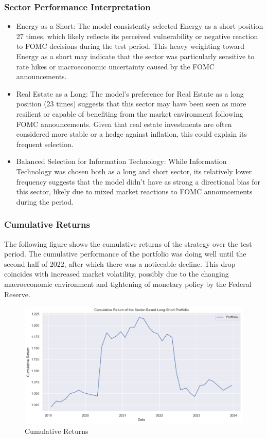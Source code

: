 \documentclass[11pt]{article}
\begin{document}
\subsubsection*{Sector Performance Interpretation}
\begin{itemize}
    \item Energy as a Short: The model consistently selected Energy as a short position 27 times, which likely reflects its perceived vulnerability or negative reaction to FOMC decisions during the test period. This heavy weighting toward Energy as a short may indicate that the sector was particularly sensitive to rate hikes or macroeconomic uncertainty caused by the FOMC announcements.
    
    \item Real Estate as a Long: The model's preference for Real Estate as a long position (23 times) suggests that this sector may have been seen as more resilient or capable of benefiting from the market environment following FOMC announcements. Given that real estate investments are often considered more stable or a hedge against inflation, this could explain its frequent selection.
    
    \item Balanced Selection for Information Technology: While Information Technology was chosen both as a long and short sector, its relatively lower frequency suggests that the model didn’t have as strong a directional bias for this sector, likely due to mixed market reactions to FOMC announcements during the period.
\end{itemize}

\subsubsection*{Cumulative Returns}
The following figure shows the cumulative returns of the strategy over the test period. The cumulative performance of the portfolio was doing well until the second half of 2022, after which there was a noticeable decline. This drop coincides with increased market volatility, possibly due to the changing macroeconomic environment and tightening of monetary policy by the Federal Reserve.

\noindent 
\begin{figure}[H] 
  \centering 
  \includegraphics[width=5.2in]{imgs/cum_ret.png}
  \caption{Cumulative Returns}
\end{figure}
\end{document}
